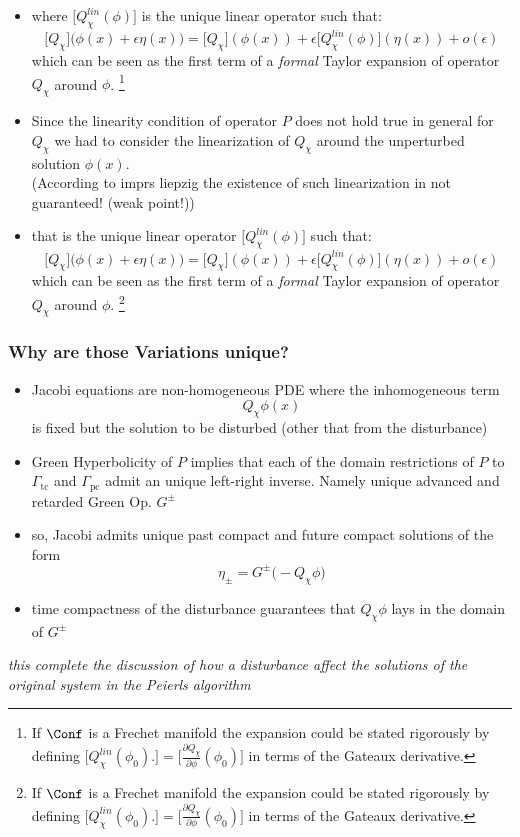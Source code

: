 \documentclass[a4paper,11pt]{scrartcl}
\begin{document}
\begin{itemize}
           \item where $\big[Q_\chi^{lin}(\phi) \big]$ is the unique linear operator such that:
            $$             \big[Q_\chi \big]( \phi(x) + \epsilon \eta(x)\big)= \big[Q_\chi \big]( \phi(x)) + \epsilon \big[Q_\chi^{lin}(\phi)  \big]( \eta(x)) + o(\epsilon) $$
        which can be seen as the first term of a \emph{formal} Taylor expansion of operator $Q_\chi$ around $\phi$.
        \footnote{If $\Conf$ is a Frechet manifold the expansion could be stated rigorously by defining $\big[Q_\chi^{lin}(\phi_0) . \big] = \big[\frac{\partial Q_\chi}{\partial \phi} (\phi_0)\big] $ in terms of the Gateaux derivative.}
           
        \item Since the linearity condition of operator $P$ does not hold true in general for $Q_\chi$ we had to consider the linearization of $Q_\chi$ around the unperturbed solution $\phi(x)$.\\
        (According to imprs liepzig the existence of such linearization in not guaranteed! (weak point!))
        \item that is the unique linear operator $\big[Q_\chi^{lin}(\phi) \big]$ such that:
            $$             \big[Q_\chi \big]( \phi(x) + \epsilon \eta(x)\big)= \big[Q_\chi \big]( \phi(x)) + \epsilon \big[Q_\chi^{lin}(\phi)  \big]( \eta(x)) + o(\epsilon) $$
        which can be seen as the first term of a \emph{formal} Taylor expansion of operator $Q_\chi$ around $\phi$.
        \footnote{If $\Conf$ is a Frechet manifold the expansion could be stated rigorously by defining $\big[Q_\chi^{lin}(\phi_0) . \big] = \big[\frac{\partial Q_\chi}{\partial \phi} (\phi_0)\big] $ in terms of the Gateaux derivative.}
        \end{itemize}
        \subsubsection*{Why are those Variations unique?}
        \begin{itemize}
           \item Jacobi equations are non-homogeneous PDE where the inhomogeneous term $$ Q_\chi \phi(x) $$ is fixed but the solution to be disturbed (other that from the disturbance)
           \item Green Hyperbolicity of $P$ implies that each of the domain restrictions of $P$ to 
           $\Gamma_{\textrm{tc}}$ and $\Gamma_{\textrm{pc}}$
           admit an unique left-right inverse. Namely unique advanced and retarded Green Op. $G^\pm$
           \item so, Jacobi admits unique past compact and future compact solutions of the form
           $$ \eta_\pm = G^\pm \big( - Q_\chi \phi \big) $$
           \item time compactness of the disturbance guarantees that  $Q_\chi \phi$ lays in the domain of $G^\pm$
    \end{itemize}
    \emph{this complete the discussion of how a disturbance affect the solutions of the original system in the Peierls algorithm}
\end{document}
